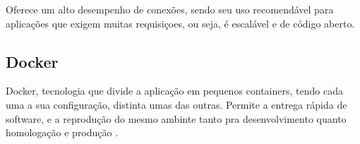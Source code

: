 Oferece um alto desempenho de conexões, sendo seu uso recomendável para aplicações que exigem muitas requisiçoes, ou seja, é escalável e de código aberto.
    
\subsection{Docker}

Docker, tecnologia que divide a aplicação em pequenos containers, tendo cada uma a sua configuração, distinta umas das outras. Permite a entrega rápida de software, e a reprodução do mesmo ambinte tanto pra desenvolvimento quanto homologação e produção \citep{dockerdocs}. 



\let\cleardoublepage\clearpage